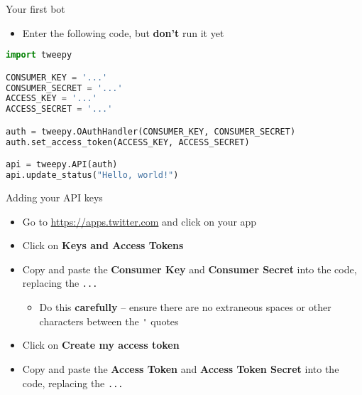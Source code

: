 \begin{frame}[fragile]{Your first bot}
    \begin{itemize}
        \item Enter the following code, but \textbf{don't} run it yet
    \end{itemize}
    \begin{lstlisting}[language=Python]
import tweepy

CONSUMER_KEY = '...'
CONSUMER_SECRET = '...'
ACCESS_KEY = '...'
ACCESS_SECRET = '...'

auth = tweepy.OAuthHandler(CONSUMER_KEY, CONSUMER_SECRET)
auth.set_access_token(ACCESS_KEY, ACCESS_SECRET)

api = tweepy.API(auth)
api.update_status("Hello, world!")
    \end{lstlisting}
\end{frame}

\begin{frame}{Adding your API keys}
    \begin{itemize}
        \item Go to \url{https://apps.twitter.com} and click on your app
        \item Click on \textbf{Keys and Access Tokens}
        \item Copy and paste the \textbf{Consumer Key} and \textbf{Consumer Secret} into the code,
                replacing the \texttt{...}
            \begin{itemize}
                \item Do this \textbf{carefully} -- ensure there are no extraneous spaces or other characters between the \lstinline{'} quotes
            \end{itemize}
        \item Click on \textbf{Create my access token}
        \item Copy and paste the \textbf{Access Token} and \textbf{Access Token Secret} into the code,
            replacing the \texttt{...}
    \end{itemize}
\end{frame}

